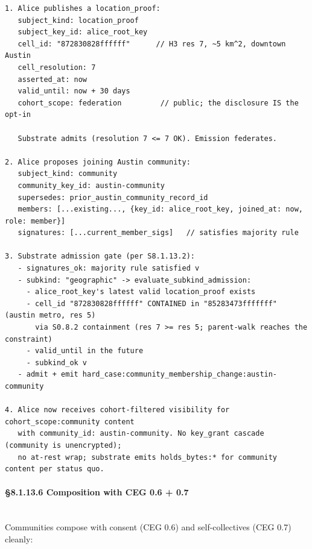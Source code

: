 \documentclass[10pt]{article}
\begin{document}
\begin{lstlisting}
1. Alice publishes a location_proof:
   subject_kind: location_proof
   subject_key_id: alice_root_key
   cell_id: "872830828ffffff"      // H3 res 7, ~5 km^2, downtown Austin
   cell_resolution: 7
   asserted_at: now
   valid_until: now + 30 days
   cohort_scope: federation         // public; the disclosure IS the opt-in

   Substrate admits (resolution 7 <= 7 OK). Emission federates.

2. Alice proposes joining Austin community:
   subject_kind: community
   community_key_id: austin-community
   supersedes: prior_austin_community_record_id
   members: [...existing..., {key_id: alice_root_key, joined_at: now, role: member}]
   signatures: [...current_member_sigs]   // satisfies majority rule

3. Substrate admission gate (per S8.1.13.2):
   - signatures_ok: majority rule satisfied v
   - subkind: "geographic" -> evaluate_subkind_admission:
     - alice_root_key's latest valid location_proof exists
     - cell_id "872830828ffffff" CONTAINED in "85283473fffffff" (austin metro, res 5)
       via S0.8.2 containment (res 7 >= res 5; parent-walk reaches the constraint)
     - valid_until in the future
     - subkind_ok v
   - admit + emit hard_case:community_membership_change:austin-community

4. Alice now receives cohort-filtered visibility for cohort_scope:community content
   with community_id: austin-community. No key_grant cascade (community is unencrypted);
   no at-rest wrap; substrate emits holds_bytes:* for community content per status quo.
\end{lstlisting}

\paragraph{§8.1.13.6 Composition with CEG 0.6 + 0.7}\mbox{}\\


Communities compose with consent (CEG 0.6) and self-collectives (CEG 0.7) cleanly:
\end{document}

